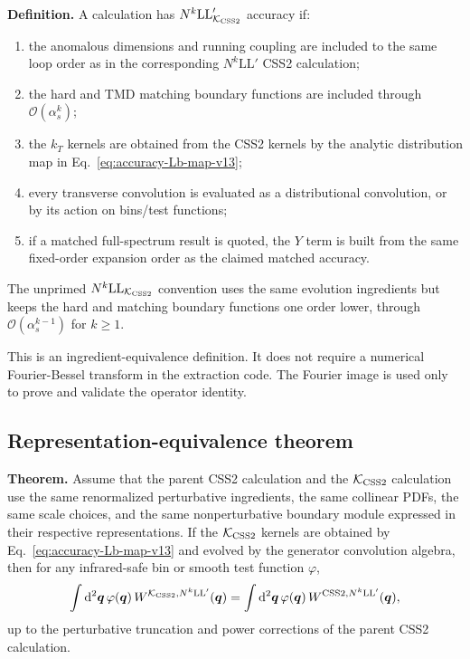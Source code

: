 \documentclass[11pt]{article}
\newcommand{\bq}{\bm{q}}
\newcommand{\dd}{\mathrm{d}}
\newcommand{\order}[1]{\mathcal{O}\!\left(#1\right)}
\newcommand{\KCSS}{\mathcal K_{\rm CSS2}}
\newcommand{\CSS}{\mathrm{CSS2}}
\begin{document}
\noindent\textbf{Definition.}
A calculation has $N^k\mathrm{LL}'_{\KCSS}$ accuracy if:
\begin{enumerate}
  \item the anomalous dimensions and running coupling are included to the same loop order
  as in the corresponding $N^k\mathrm{LL}'$ CSS2 calculation;
  \item the hard and TMD matching boundary functions are included through
  $\order{\alpha_s^k}$;
  \item the $k_T$ kernels are obtained from the CSS2 kernels by the analytic distribution
  map in Eq.~\eqref{eq:accuracy-Lb-map-v13};
  \item every transverse convolution is evaluated as a distributional convolution, or by its
  action on bins/test functions;
  \item if a matched full-spectrum result is quoted, the $Y$ term is built from the same
  fixed-order expansion order as the claimed matched accuracy.
\end{enumerate}
The unprimed $N^k\mathrm{LL}_{\KCSS}$ convention uses the same evolution ingredients but
keeps the hard and matching boundary functions one order lower, through
$\order{\alpha_s^{k-1}}$ for $k\ge1$.

This is an ingredient-equivalence definition.  It does not require a numerical Fourier-Bessel
transform in the extraction code.  The Fourier image is used only to prove and validate the
operator identity.

\subsection{Representation-equivalence theorem}

\noindent\textbf{Theorem.}
Assume that the parent CSS2 calculation and the $\KCSS$ calculation use the same
renormalized perturbative ingredients, the same collinear PDFs, the same scale choices, and
the same nonperturbative boundary module expressed in their respective representations.  If
the $\KCSS$ kernels are obtained by Eq.~\eqref{eq:accuracy-Lb-map-v13} and evolved by the
generator convolution algebra, then for any infrared-safe bin or smooth test function $\varphi$,
\begin{equation}
  \int \dd^2\bq\,\varphi(\bq)\,
  W^{\KCSS,N^k\mathrm{LL}'}(\bq)
  =
  \int \dd^2\bq\,\varphi(\bq)\,
  W^{\CSS,N^k\mathrm{LL}'}(\bq),
  \label{eq:accuracy-theorem-v13}
\end{equation}
up to the perturbative truncation and power corrections of the parent CSS2 calculation.
\end{document}
